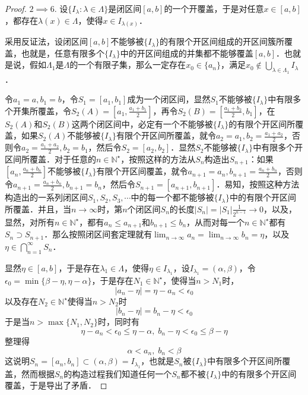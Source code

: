 \documentclass{ctexart}
\theoremstyle{definition}
\theoremstyle{definition}
\theoremstyle{plain}
\theoremstyle{plain}
\theoremstyle{plain}
\theoremstyle{definition}
\newcommand{\nat}{\mathbb{N}^\star}
\begin{document}
\begin{proof}
$2 \implies 6$. 设$\{I_\lambda : \lambda \in \Lambda \}$是闭区间$[a,b]$的一个开覆盖，于是对任意$x \in [a,b]$，都存在$\lambda(x) \in \Lambda$，使得$x \in I_{\lambda(x)}$．

\noindent 采用反证法，设闭区间$[a,b]$不能够被$\{I_\lambda\}$的有限个开区间组成的开区间簇所覆盖，也就是，任意有限多个$\{I_\lambda\}$中的开区间组成的并集都不能够覆盖$[a,b]$．也就是说，假如$\Lambda_1$是$\Lambda$的一个有限子集，那么一定存在$x_0 \in \{ a_n \}$，满足$x_0 \not\in \displaystyle\bigcup_{\lambda \in \Lambda_1} I_\lambda$．

\noindent 令$a_1 = a, b_1 = b$，令$S_1 = [a_1,b_1]$成为一个闭区间，显然$S_1$不能够被$\{I_\lambda\}$中有限多个开集所覆盖，令$S_2(A) = \displaystyle [a_1, \frac{a_1+b_1}{2}]$，再令$S_2(B) = [\displaystyle\frac{a_1+b_2}{2},b_1]$，在$S_2(A)$和$S_2(B)$这两个闭区间中，必定有一个不能够被$\{I_\lambda\}$的有限个开区间所覆盖，如果$S_2(A)$不能够被$\{I_\lambda\}$有限个开区间所覆盖，就令$a_2 = a_1, b_2 = \displaystyle\frac{a_1+a_2}{2}$，否则令$a_2=\displaystyle\frac{a_1+a_2}{2}, b_2=b_1$，然后令$S_2 = [a_2,b_2]$．显然$S_2$不能够被$\{I_\lambda\}$中有限多个开区间所覆盖．对于任意的$n \in \nat$，按照这样的方法从$S_n$构造出$S_{n+1}$：如果$[a_n,\displaystyle\frac{a_n+b_n}{2}]$不能够被$\{I_\lambda\}$有限个开区间覆盖，就令$a_{n+1}=a_n, b_{n+1} =\displaystyle\frac{a_n+b_n}{2}$，否则令$a_{n+1}=\displaystyle\frac{a_n+b_n}{2},b_{n+1}=b_n$，然后令$S_{n+1}=[a_{n+1},b_{n+1}]$．易知，按照这种方法构造出的一系列闭区间$S_1,S_2,S_3,\cdots$中的每一个都不能够被$\{I_\lambda\}$中的有限个开区间所覆盖．并且，当$n \to \infty$时，第$n$个闭区间$S_n$的长度$|S_n| = |S_1|\displaystyle\frac{1}{2^{n-1}}\to 0$，以及，显然，对所有$n \in \nat$，都有$a_n \leq a_{n+1}$和$b_{n+1} \leq b_n$，从而对每一个$n \in \nat$都有$S_n \supset S_{n+1}$．那么按照闭区间套定理就有$\displaystyle \lim_{n\to\infty} a_n = \lim_{n\to\infty}b_n = \eta$，以及$\eta \in \displaystyle\bigcap_{n=1}^\infty S_n$．

\noindent 显然$\eta \in [a,b]$，于是存在$\lambda_1 \in \Lambda$，使得$\eta \in I_{\lambda_1}$，设$I_{\lambda_1} = (\alpha,\beta)$，令$\epsilon_0 = \min \{\beta-\eta,\eta-\alpha \}$，于是存在$N_1 \in \nat$，使得当$n > N_1$时，
\begin{equation}
    |a_n - \eta| = \eta - a_n < \epsilon_0
\end{equation}
以及存在$N_2 \in \nat$使得当$n > N_2$时
\begin{equation}
    |b_n - \eta| = b_n - \eta < \epsilon_0
\end{equation}
于是当$n > \max \{N_1, N_2\}$时，同时有
\begin{equation}
    \eta - a_n < \epsilon_0 \leq \eta - \alpha, \; b_n - \eta < \epsilon_0 \leq \beta - \eta
\end{equation}
整理得
\begin{equation}
    \alpha < a_n, \; b_n < \beta
\end{equation}
这说明$S_n = [a_n, b_n] \subset (\alpha, \beta) = I_{\lambda_1}$，也就是$S_n$被$\{I_\lambda\}$中有限多个开区间所覆盖，然而根据$S_n$的构造过程我们知道任何一个$S_n$都不被$\{I_\lambda\}$中的有限多个开区间覆盖，于是导出了矛盾．
\end{proof}
\end{document}
